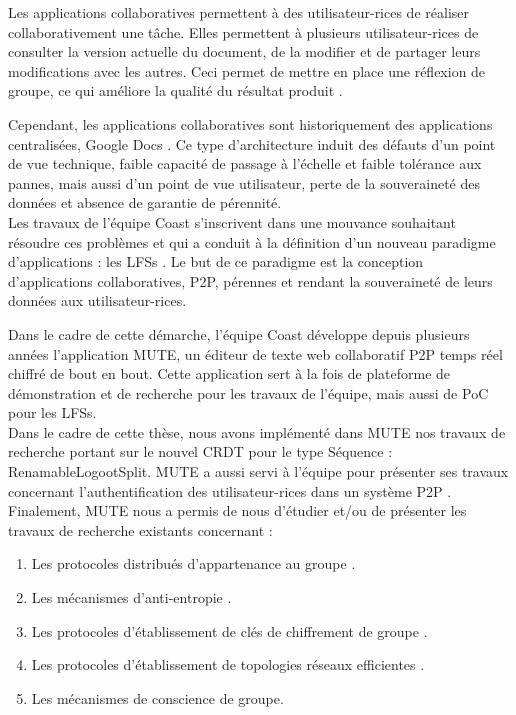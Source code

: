 Les applications collaboratives permettent à des utilisateur-rices de réaliser collaborativement une tâche.
Elles permettent à plusieurs utilisateur-rices de consulter la version actuelle du document, de la modifier et de partager leurs modifications avec les autres.
Ceci permet de mettre en place une réflexion de groupe, ce qui améliore la qualité du résultat produit \cite{2004-empirical-study-collaborative-writing,2005-internet-encyclopaedias-head-to-head}.

Cependant, les applications collaboratives sont historiquement des applications centralisées, \eg Google Docs \cite{gdocs}.
Ce type d'architecture induit des défauts d'un point de vue technique, \eg faible capacité de passage à l'échelle et faible tolérance aux pannes, mais aussi d'un point de vue utilisateur, \eg perte de la souveraineté des données et absence de garantie de pérennité.\\

Les travaux de l'équipe Coast s'inscrivent dans une mouvance souhaitant résoudre ces problèmes et qui a conduit à la définition d'un nouveau paradigme d'applications : les \acp{LFS} \cite{localfirstsoftware2019}.
Le but de ce paradigme est la conception d'applications collaboratives, \ac{P2P}, pérennes et rendant la souveraineté de leurs données aux utilisateur-rices.

Dans le cadre de cette démarche, l'équipe Coast développe depuis plusieurs années l'application \acf{MUTE}, un éditeur de texte web collaboratif \ac{P2P} temps réel chiffré de bout en bout.
Cette application sert à la fois de plateforme de démonstration et de recherche pour les travaux de l'équipe, mais aussi de \ac{PoC} pour les \acp{LFS}.\\

Dans le cadre de cette thèse, nous avons implémenté dans \ac{MUTE} nos travaux de recherche portant sur le nouvel \ac{CRDT} pour le type Séquence : RenamableLogootSplit.
\ac{MUTE} a aussi servi à l'équipe pour présenter ses travaux concernant l'authentification des utilisateur-rices dans un système \ac{P2P} \cite{2018-trusternity-long}.
Finalement, \ac{MUTE} nous a permis de nous d'étudier et/ou de présenter les travaux de recherche existants concernant :
\begin{enumerate}
    \item Les protocoles distribués d'appartenance au groupe \cite{swim2002}.
    \item Les mécanismes d'anti-entropie \cite{1983-anti-entropy-vv}.
    \item Les protocoles d'établissement de clés de chiffrement de groupe \cite{1995-burmester-desmedt}.
    \item Les protocoles d'établissement de topologies réseaux efficientes \cite{2018-spray-nedelec}.
    \item Les mécanismes de conscience de groupe.
\end{enumerate}

